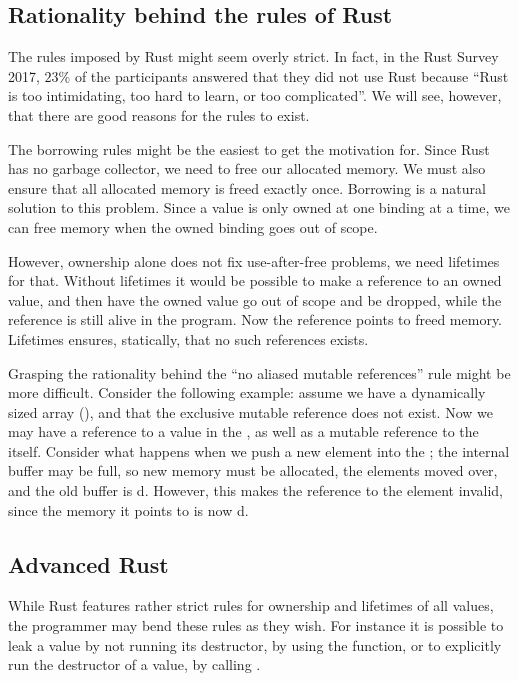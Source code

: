 \documentclass[a4paper,twoside]{report}
\begin{document}

\subsection{Rationality behind the rules of Rust}
The rules imposed by Rust might seem overly strict.  In fact, in the Rust
Survey 2017, $23\%$ of the participants answered that they did not use Rust
because ``Rust is too intimidating, too hard to learn, or too
complicated''\cite{rustsurvey2017}.  We will see, however, that there are good
reasons for the rules to exist.

The borrowing rules might be the easiest to get the motivation for.  Since Rust
has no garbage collector, we need to free our allocated memory.  We must also
ensure that all allocated memory is freed exactly once.  Borrowing is a natural
solution to this problem. Since a value is only owned at one binding at a time,
we can free memory when the owned binding goes out of scope.

However, ownership alone does not fix use-after-free problems, we need
lifetimes for that.  Without lifetimes it would be possible to make a reference
to an owned value, and then have the owned value go out of scope and be
dropped, while the reference is still alive in the program. Now the reference
points to freed memory. Lifetimes ensures, statically, that no such references
exists.

Grasping the rationality behind the ``no aliased mutable references'' rule
might be more difficult. Consider the following example: assume we have a
dynamically sized array (), and that the exclusive mutable reference
does not exist. Now we may have a reference to a value in the , as
well as a mutable reference to the  itself.  Consider what happens
when we push a new element into the ; the internal buffer may be
full, so new memory must be allocated, the elements moved over, and the old
buffer is d.  However, this makes the reference to the element
invalid, since the memory it points to is now d.

\subsection{Advanced Rust}
While Rust features rather strict rules for ownership and lifetimes of all
values, the programmer may bend these rules as they wish.  For instance it is
possible to leak a value by not running its destructor, by using the
 function, or to explicitly run the destructor of a
value, by calling .
\end{document}
